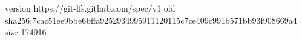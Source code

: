 version https://git-lfs.github.com/spec/v1
oid sha256:7cac51ee9bbe6bffa9252934995911120115c7ce409c991b571bb93f908669a4
size 174916
